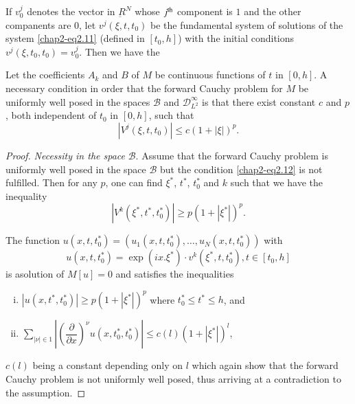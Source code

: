 If $v^j_0$ denotes the vector in $\underbar{R}^N$ whose $ j^{\rm th}$
component is $1$ and the other companents are $0$,  let $v^j (\xi, t,
t_0)$ be the fundamental system of solutions of the system \eqref{chap2-eq2.11}
(defined in $[t_0, h]$) with the initial conditions $ v^j (\xi,
t_0,  t_0) = v_0^j$. Then we have the  

\begin{proposition}[Petrowsky]\label{chap2-sec2-prop2}
 Let the coefficients $A_k$ and $B$ of $M$ be
 continuous functions of $t$ in $ [0, h]$. A necessary condition in
 order that the forward Cauchy problem for $ M$ be uniformly well
 posed in the spaces $ \mathscr{B} $ and $ \mathscr{D}^\infty _{L^2}$
 is that there exist constant $c$ and $p$,  both independent of $t_0$
 in $[0, h]$,  such that  
\begin{equation}
| V^j (\xi , t,  t_0 ) | \leq c(1 +|\xi | )^p. \tag{2.12}\label{chap2-eq2.12}   
\end{equation}
\end{proposition}

\begin{proof}
{\em Necessity in the space} $ \mathscr{B}$. Assume that the forward
Cauchy problem is uniformly well posed in the  space $ \mathscr{B}$
but the condition \eqref{chap2-eq2.12} is not fulfilled. Then for any $p$,  one can
find $ \xi^*$, $t^*$,  $t^*_0$ and $k$ such that we have the inequality  
$$
| V^k (\xi^*,  t^*,  t^*_0) | \geq p(1+ |\xi^*| )^p.
$$

The function $u(x, t, t^*_0) = (u_1( x,  t, t^*_0), \ldots,  u_N (x,
t, t^*_0))$ with  
\begin{equation}
u (x, t, t^*_0) = \exp (ix. \xi^* ) \cdot v^k (\xi ^* , t, t^*_0),  t \in [
  t_0, h] \tag{2.13}\label{chap2-eq2.13}   
\end{equation}
is a\pageoriginale solution of $ M [ u] = 0$ and satisfies the inequalities  
\begin{enumerate}[(i)]
\item $ | u (x, t^*,  t^*_0) | \geq p(1+ |\xi ^*|)^p$ where $ t^*_0
  \leq t^* \leq h$,  and  

\item $\sum_{| \nu | \in 1} \left|\left(\dfrac{\partial}{\partial
  x}\right)^\nu u \left(x,  t^*_0,  t^*_0\right)\right| \leq c(l) (1+ |\xi ^*| )^l$,  
\end{enumerate}
$c(l)$ being a constant depending only on $l$ which again show that the
forward Cauchy problem is not uniformly well posed,  thus arriving at
a contradiction to the assumption.  
\end{proof}

